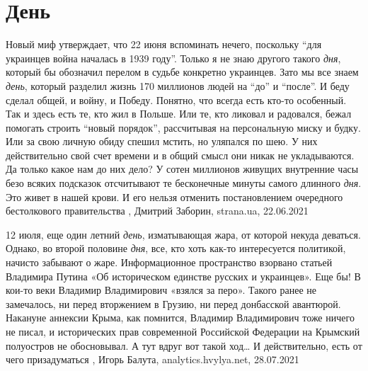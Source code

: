  
 
 
 
 
\chapter{День}
\label{sec:slova.denj}

Новый миф утверждает, что 22 июня вспоминать нечего, поскольку \enquote{для украинцев
война началась в 1939 году}. Только я не знаю другого такого \emph{дня}, который бы
обозначил перелом в судьбе конкретно украинцев. Зато мы все знаем \emph{день}, который
разделил жизнь 170 миллионов людей на \enquote{до} и \enquote{после}. И беду сделал общей, и
войну, и Победу. Понятно, что всегда есть кто-то особенный. Так и здесь есть
те, кто жил в Польше. Или те, кто ликовал и радовался, бежал помогать строить
\enquote{новый порядок}, рассчитывая на персональную миску и будку. Или за свою личную
обиду спешил мстить, но уляпался по шею. У них действительно свой счет времени
и в общий смысл они никак не укладываются.  Да только какое нам до них дело?  У
сотен миллионов живущих внутренние часы безо всяких подсказок отсчитывают те
бесконечные минуты самого длинного \emph{дня}. Это живет в нашей крови. И его
нельзя отменить постановлением очередного бестолкового правительства
 , 
 Дмитрий Заборин, strana.ua, 22.06.2021

12 июля, еще один летний \emph{день}, изматывающая жара, от которой некуда деваться.
Однако, во второй половине \emph{дня}, все, кто хоть как-то интересуется политикой,
начисто забывают о жаре. Информационное пространство взорвано статьей Владимира
Путина «Об историческом единстве русских и украинцев». Еще бы! В кои-то веки
Владимир Владимирович «взялся за перо». Такого ранее не замечалось, ни перед
вторжением в Грузию, ни перед донбасской авантюрой. Накануне аннексии Крыма,
как помнится, Владимир Владимирович тоже ничего не писал, и исторических прав
современной Российской Федерации на Крымский полуостров не обосновывал. А тут
вдруг вот такой ход… И действительно, есть от чего призадуматься
, 
Игорь Балута, analytics.hvylya.net, 28.07.2021

